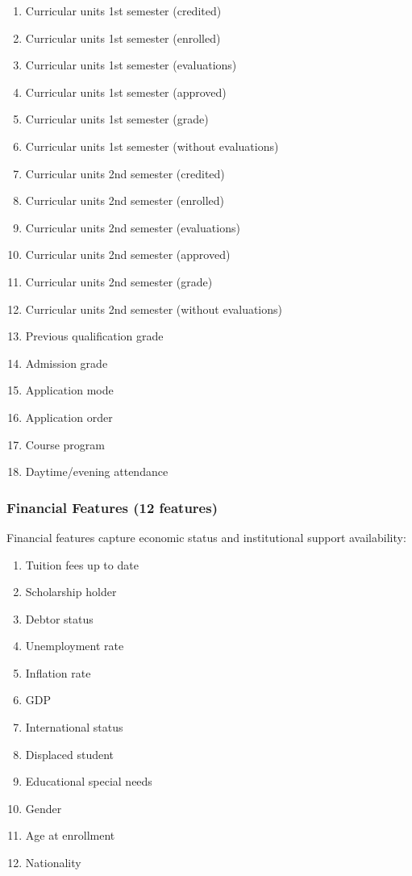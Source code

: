 \begin{enumerate}
\item Curricular units 1st semester (credited)
\item Curricular units 1st semester (enrolled)
\item Curricular units 1st semester (evaluations)
\item Curricular units 1st semester (approved)
\item Curricular units 1st semester (grade)
\item Curricular units 1st semester (without evaluations)
\item Curricular units 2nd semester (credited)
\item Curricular units 2nd semester (enrolled)
\item Curricular units 2nd semester (evaluations)
\item Curricular units 2nd semester (approved)
\item Curricular units 2nd semester (grade)
\item Curricular units 2nd semester (without evaluations)
\item Previous qualification grade
\item Admission grade
\item Application mode
\item Application order
\item Course program
\item Daytime/evening attendance
\end{enumerate}

\subsubsection{Financial Features (12 features)}

Financial features capture economic status and institutional support availability:

\begin{enumerate}
\item Tuition fees up to date
\item Scholarship holder
\item Debtor status
\item Unemployment rate
\item Inflation rate
\item GDP
\item International status
\item Displaced student
\item Educational special needs
\item Gender
\item Age at enrollment
\item Nationality
\end{enumerate}

